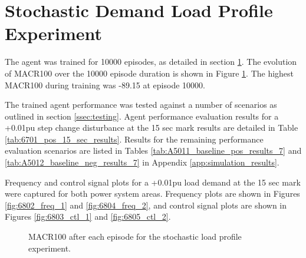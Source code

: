 \section{Stochastic Demand Load Profile Experiment}\label{sec:stochastic_load_demand}
The agent was trained for 10000 episodes, as detailed in section \ref{sec:stochastic_load_demand}. The evolution of MACR100 over the 10000 episode duration is shown in Figure \ref{fig:6801_average_reward}. The highest MACR100 during training was -89.15 at episode 10000.

The trained agent performance was tested against a number of scenarios as outlined in section \ref{ssec:testing}. Agent performance evaluation results for a +0.01pu step change disturbance at the 15 sec mark results are detailed in Table \ref{tab:6701_pos_15_sec_results}. Results for the remaining performance evaluation scenarios are listed in Tables \ref{tab:A5011_baseline_pos_results_7} and \ref{tab:A5012_baseline_neg_results_7} in Appendix \ref{app:simulation_results}. 

Frequency and control signal plots for a +0.01pu load demand at the 15 sec mark were captured for both power system areas. Frequency plots are shown in Figures \ref{fig:6802_freq_1} and \ref{fig:6804_freq_2}, and control signal plots are shown in Figures \ref{fig:6803_ctl_1} and \ref{fig:6805_ctl_2}.

\begin{figure}[h]
	\centering
	
	\caption{MACR100 after each episode for the stochastic load profile experiment.}\label{fig:6801_average_reward}
\end{figure}



